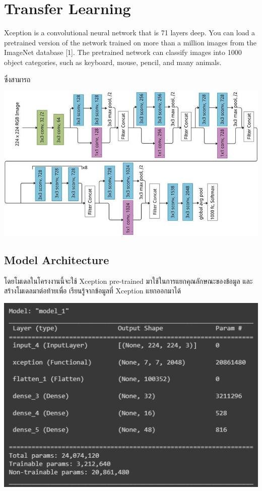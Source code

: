 \section{Transfer Learning}
Xception is a convolutional neural network that is 71 layers deep.
 You can load a pretrained version of the network trained on more than a million images from the ImageNet database [1].
  The pretrained network can classify images into 1000 object categories, such as keyboard, mouse, pencil, and many animals.

  ซึ่งสามารถ
\begin{center}
  \includegraphics[scale=0.35]{pic/x.png}
\end{center}
  
\subsection{Model Architecture}
โดยโมเดลในโครงงานนี้จะใช้ Xception pre-trained มาใช้ในการแยกคุณลักษณะของข้อมูล  และสร้างโมเดลมาต่อท้ายเพื่อ เรียนรู้จากข้อมูลที่ Xception แยกออกมาได้
\begin{center}
  \includegraphics[scale=0.45]{pic/model.png}
\end{center}
  
